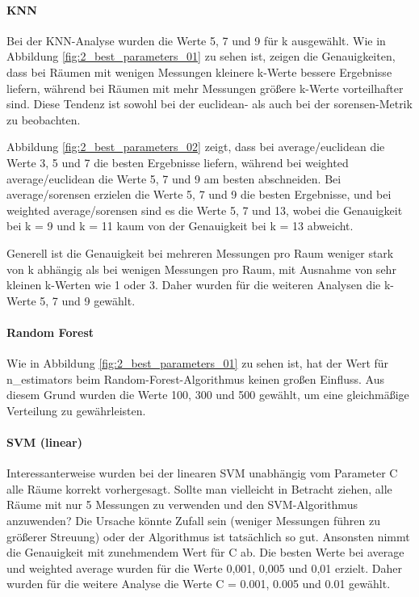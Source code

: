 \paragraph{KNN}

Bei der KNN-Analyse wurden die Werte 5, 7 und 9 für k ausgewählt. Wie in Abbildung \ref{fig:2_best_parameters_01} zu sehen ist, zeigen die Genauigkeiten, dass bei Räumen mit wenigen Messungen kleinere k-Werte bessere Ergebnisse liefern, während bei Räumen mit mehr Messungen größere k-Werte vorteilhafter sind. Diese Tendenz ist sowohl bei der euclidean- als auch bei der sorensen-Metrik zu beobachten.


Abbildung \ref{fig:2_best_parameters_02} zeigt, dass bei average/euclidean die Werte 3, 5 und 7 die besten Ergebnisse liefern, während bei weighted average/euclidean die Werte 5, 7 und 9 am besten abschneiden. Bei average/sorensen erzielen die Werte 5, 7 und 9 die besten Ergebnisse, und bei weighted average/sorensen sind es die Werte 5, 7 und 13, wobei die Genauigkeit bei k = 9 und k = 11 kaum von der Genauigkeit bei k = 13 abweicht.

Generell ist die Genauigkeit bei mehreren Messungen pro Raum weniger stark von k abhängig als bei wenigen Messungen pro Raum, mit Ausnahme von sehr kleinen k-Werten wie 1 oder 3. Daher wurden für die weiteren Analysen die k-Werte 5, 7 und 9 gewählt.

\paragraph{Random Forest}

Wie in Abbildung \ref{fig:2_best_parameters_01} zu sehen ist, hat der Wert für n\_estimators beim Random-Forest-Algorithmus keinen großen Einfluss. Aus diesem Grund wurden die Werte 100, 300 und 500 gewählt, um eine gleichmäßige Verteilung zu gewährleisten.

\paragraph{SVM (linear)}


Interessanterweise wurden bei der linearen SVM unabhängig vom Parameter C alle Räume korrekt vorhergesagt. Sollte man vielleicht in Betracht ziehen, alle Räume mit nur 5 Messungen zu verwenden und den SVM-Algorithmus anzuwenden? Die Ursache könnte Zufall sein (weniger Messungen führen zu größerer Streuung) oder der Algorithmus ist tatsächlich so gut. Ansonsten nimmt die Genauigkeit mit zunehmendem Wert für C ab. Die besten Werte bei average und weighted average wurden für die Werte 0,001, 0,005 und 0,01 erzielt. Daher wurden für die weitere Analyse die Werte C = 0.001, 0.005 und 0.01 gewählt.

